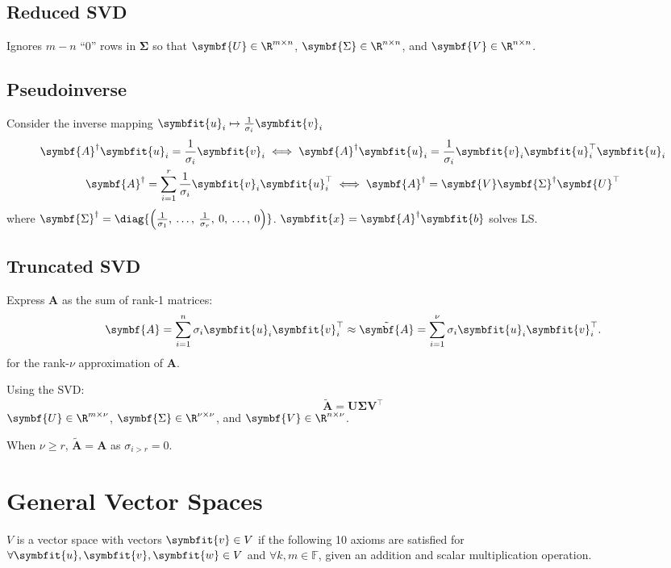 \documentclass{article}
\begin{document}
\begin{multicols*}{3}
    \subsection{Reduced SVD}
    Ignores \(m - n\) ``0'' rows in \(\symbf{\Sigma}\) so that \(\symbf{U} \in \R^{m \times n}\), \(\symbf{\Sigma} \in \R^{n \times n}\), and \(\symbf{V} \in \R^{n \times n}\).
    \subsection{Pseudoinverse}
    Consider the inverse mapping \(\symbfit{u}_i \mapsto \frac{1}{\sigma_i} \symbfit{v}_i\)
    \begin{gather*}
        \symbf{A}^\dagger \symbfit{u}_i = \frac{1}{\sigma_i} \symbfit{v}_i
        \iff
        \symbf{A}^\dagger \symbfit{u}_i = \frac{1}{\sigma_i} \symbfit{v}_i \symbfit{u}^\top_i \symbfit{u}_i \\
        \symbf{A}^\dagger = \sum_{i = 1}^r \frac{1}{\sigma_i} \symbfit{v}_i \symbfit{u}^\top_i
        \iff
        \symbf{A}^\dagger = \symbf{V} \symbf{\Sigma}^\dagger \symbf{U}^\top
    \end{gather*}
    where \(\symbf{\Sigma}^\dagger = \diag{\left( \frac{1}{\sigma_1},\: \dots,\: \frac{1}{\sigma_r},\: 0,\: \dots,\: 0 \right)}\).
    \(\symbfit{x} = \symbf{A}^\dagger \symbfit{b}\) solves LS\@.
    \subsection{Truncated SVD}
    Express \(\symbf{A}\) as the sum of rank-1 matrices:
    \begin{equation*}
        \symbf{A} = \sum_{i = 1}^n \sigma_i \symbfit{u}_i \symbfit{v}^\top_i \approx \tilde{\symbf{A}} = \sum_{i = 1}^\nu \sigma_i \symbfit{u}_i \symbfit{v}^\top_i.
    \end{equation*}
    for the rank-\(\nu\) approximation of \(\symbf{A}\).

    Using the SVD\@:
    \begin{equation*}
        \tilde{\symbf{A}} = \symbf{U} \symbf{\Sigma} \symbf{V}^\top
    \end{equation*}
    \(\symbf{U} \in \R^{m \times \nu}\), \(\symbf{\Sigma} \in \R^{\nu \times \nu}\), and \(\symbf{V} \in \R^{n \times \nu}\).

    When \(\nu \geq r\), \(\tilde{\symbf{A}} = \symbf{A}\) as \(\sigma_{i > r} = 0\).
    \section{General Vector Spaces}
    \(V\) is a vector space with vectors \(\symbfit{v} \in V\) if the following 10 axioms are satisfied
    for \(\forall \symbfit{u}, \symbfit{v}, \symbfit{w} \in V\) and \(\forall k, m \in \mathbb{F}\),
    given an addition and scalar multiplication operation.


\end{multicols*}
\end{document}
